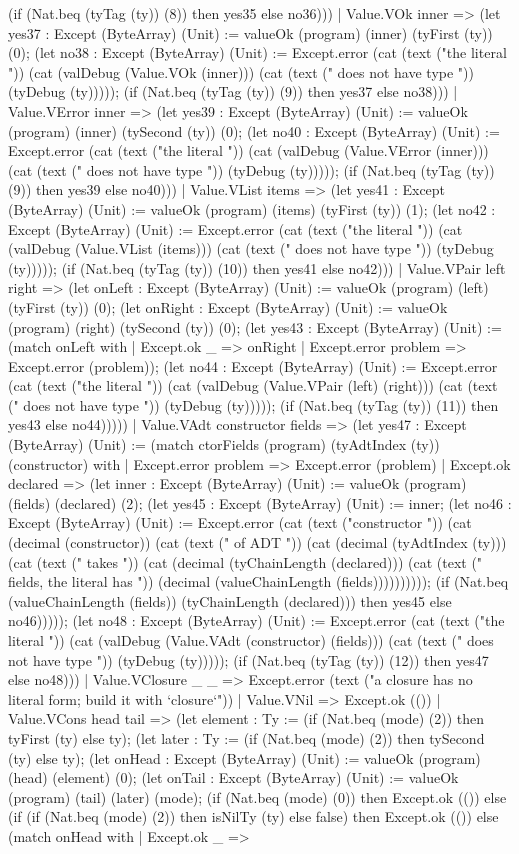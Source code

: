 \documentclass[11pt]{article}
\begin{document}
(if (Nat.beq (tyTag (ty)) (8)) then yes35 else no36))) | Value.VOk inner => (let yes37 : Except (ByteArray) (Unit) := valueOk (program) (inner) (tyFirst (ty)) (0); (let no38 : Except (ByteArray) (Unit) := Except.error (cat (text ("the literal ")) (cat (valDebug (Value.VOk (inner))) (cat (text (" does not have type ")) (tyDebug (ty))))); (if (Nat.beq (tyTag (ty)) (9)) then yes37 else no38))) | Value.VError inner => (let yes39 : Except (ByteArray) (Unit) := valueOk (program) (inner) (tySecond (ty)) (0); (let no40 : Except (ByteArray) (Unit) := Except.error (cat (text ("the literal ")) (cat (valDebug (Value.VError (inner))) (cat (text (" does not have type ")) (tyDebug (ty))))); (if (Nat.beq (tyTag (ty)) (9)) then yes39 else no40))) | Value.VList items => (let yes41 : Except (ByteArray) (Unit) := valueOk (program) (items) (tyFirst (ty)) (1); (let no42 : Except (ByteArray) (Unit) := Except.error (cat (text ("the literal ")) (cat (valDebug (Value.VList (items))) (cat (text (" does not have type ")) (tyDebug (ty))))); (if (Nat.beq (tyTag (ty)) (10)) then yes41 else no42))) | Value.VPair left right => (let onLeft : Except (ByteArray) (Unit) := valueOk (program) (left) (tyFirst (ty)) (0); (let onRight : Except (ByteArray) (Unit) := valueOk (program) (right) (tySecond (ty)) (0); (let yes43 : Except (ByteArray) (Unit) := (match onLeft with | Except.ok \_ => onRight | Except.error problem => Except.error (problem)); (let no44 : Except (ByteArray) (Unit) := Except.error (cat (text ("the literal ")) (cat (valDebug (Value.VPair (left) (right))) (cat (text (" does not have type ")) (tyDebug (ty))))); (if (Nat.beq (tyTag (ty)) (11)) then yes43 else no44))))) | Value.VAdt constructor fields => (let yes47 : Except (ByteArray) (Unit) := (match ctorFields (program) (tyAdtIndex (ty)) (constructor) with | Except.error problem => Except.error (problem) | Except.ok declared => (let inner : Except (ByteArray) (Unit) := valueOk (program) (fields) (declared) (2); (let yes45 : Except (ByteArray) (Unit) := inner; (let no46 : Except (ByteArray) (Unit) := Except.error (cat (text ("constructor ")) (cat (decimal (constructor)) (cat (text (" of ADT ")) (cat (decimal (tyAdtIndex (ty))) (cat (text (" takes ")) (cat (decimal (tyChainLength (declared))) (cat (text (" fields, the literal has ")) (decimal (valueChainLength (fields)))))))))); (if (Nat.beq (valueChainLength (fields)) (tyChainLength (declared))) then yes45 else no46))))); (let no48 : Except (ByteArray) (Unit) := Except.error (cat (text ("the literal ")) (cat (valDebug (Value.VAdt (constructor) (fields))) (cat (text (" does not have type ")) (tyDebug (ty))))); (if (Nat.beq (tyTag (ty)) (12)) then yes47 else no48))) | Value.VClosure \_ \_ => Except.error (text ("a closure has no literal form; build it with `closure`")) | Value.VNil => Except.ok (()) | Value.VCons head tail => (let element : Ty := (if (Nat.beq (mode) (2)) then tyFirst (ty) else ty); (let later : Ty := (if (Nat.beq (mode) (2)) then tySecond (ty) else ty); (let onHead : Except (ByteArray) (Unit) := valueOk (program) (head) (element) (0); (let onTail : Except (ByteArray) (Unit) := valueOk (program) (tail) (later) (mode); (if (Nat.beq (mode) (0)) then Except.ok (()) else (if (if (Nat.beq (mode) (2)) then isNilTy (ty) else false) then Except.ok (()) else (match onHead with | Except.ok \_ => 
\end{document}
